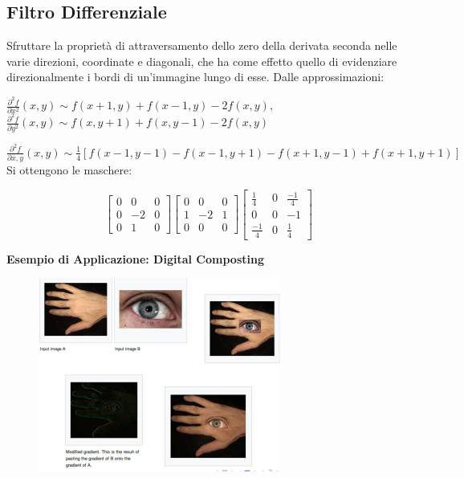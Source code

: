 \subsection{Filtro Differenziale}
Sfruttare la proprietà di attraversamento dello zero della derivata seconda nelle varie direzioni, coordinate e diagonali, che ha come effetto quello di evidenziare direzionalmente i bordi di un'immagine lungo di esse.
Dalle approssimazioni:
\begin{center}
    $\frac{\partial^2{f}}{\partial{x}^2}(x,y) \sim f(x+1,y)+f(x-1,y)-2f(x,y),$
    \\$\frac{\partial^2{f}}{\partial{y}^2}(x,y) \sim f(x,y+1)+f(x,y-1)-2f(x,y)$
\end{center}
$\frac{\partial^2{f}}{\partial{x,y}}(x,y) \sim \frac{1}{4}[f(x-1,y-1)-f(x-1,y+1)-f(x+1,y-1)+f(x+1, y+1)]$
\\Si ottengono le maschere:
\begin{center}
    \[
        \begin{bmatrix}
            0 & 0  & 0 \\
            0 & -2 & 0 \\
            0 & 1  & 0
        \end{bmatrix}
        \begin{bmatrix}
            0 & 0  & 0 \\
            1 & -2 & 1 \\
            0 & 0  & 0
        \end{bmatrix}
        \begin{bmatrix}
            \frac{1}{4}  & 0 & \frac{-1}{4} \\
            0            & 0 & -1           \\
            \frac{-1}{4} & 0 & \frac{1}{4}
        \end{bmatrix}
    \]
\end{center}
\textbf{Esempio di Applicazione: Digital Composting}
\begin{figure}[H]
    \centering
    \includegraphics[width=\linewidth, keepaspectratio]{capitoli/immagini/imgs/digital-composing.png}
\end{figure}

